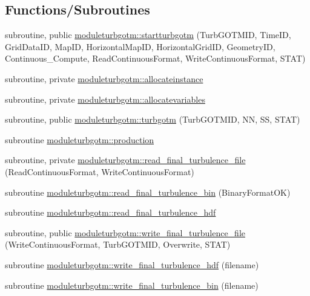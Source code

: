 \subsection*{Functions/\+Subroutines}
\begin{DoxyCompactItemize}
\item 
subroutine, public \mbox{\hyperlink{namespacemoduleturbgotm_ade6cfc34dc78769397885a40df0e608b}{moduleturbgotm\+::startturbgotm}} (Turb\+G\+O\+T\+M\+ID, Time\+ID, Grid\+Data\+ID, Map\+ID, Horizontal\+Map\+ID, Horizontal\+Grid\+ID, Geometry\+ID, Continuous\+\_\+\+Compute, Read\+Continuous\+Format, Write\+Continuous\+Format, S\+T\+AT)
\item 
subroutine, private \mbox{\hyperlink{namespacemoduleturbgotm_a1f367dad0fd7a9dba96b5da89226bfdb}{moduleturbgotm\+::allocateinstance}}
\item 
subroutine, private \mbox{\hyperlink{namespacemoduleturbgotm_ad863a5918db79e19552388fff6750b22}{moduleturbgotm\+::allocatevariables}}
\item 
subroutine, public \mbox{\hyperlink{namespacemoduleturbgotm_ab0d8f0e83e75ef88108e4b2bf04543c0}{moduleturbgotm\+::turbgotm}} (Turb\+G\+O\+T\+M\+ID, NN, SS, S\+T\+AT)
\item 
subroutine \mbox{\hyperlink{namespacemoduleturbgotm_a67c6b885be20c57ed033df6706d9adab}{moduleturbgotm\+::production}}
\item 
subroutine, private \mbox{\hyperlink{namespacemoduleturbgotm_afb5ea6833bc3fb9e5ef6bc373e92a305}{moduleturbgotm\+::read\+\_\+final\+\_\+turbulence\+\_\+file}} (Read\+Continuous\+Format, Write\+Continuous\+Format)
\item 
subroutine \mbox{\hyperlink{namespacemoduleturbgotm_ad942836f5c266b4ce7d03ca96fdf696a}{moduleturbgotm\+::read\+\_\+final\+\_\+turbulence\+\_\+bin}} (Binary\+Format\+OK)
\item 
subroutine \mbox{\hyperlink{namespacemoduleturbgotm_a8389365bd5c5c531982068da1e23ce6f}{moduleturbgotm\+::read\+\_\+final\+\_\+turbulence\+\_\+hdf}}
\item 
subroutine, public \mbox{\hyperlink{namespacemoduleturbgotm_a01feda969236095bbd86a65a94f4e37c}{moduleturbgotm\+::write\+\_\+final\+\_\+turbulence\+\_\+file}} (Write\+Continuous\+Format, Turb\+G\+O\+T\+M\+ID, Overwrite, S\+T\+AT)
\item 
subroutine \mbox{\hyperlink{namespacemoduleturbgotm_afdd63df0733f254a488fb73b240eb944}{moduleturbgotm\+::write\+\_\+final\+\_\+turbulence\+\_\+hdf}} (filename)
\item 
subroutine \mbox{\hyperlink{namespacemoduleturbgotm_a471003d8ec76b83e26d91b8ed4815546}{moduleturbgotm\+::write\+\_\+final\+\_\+turbulence\+\_\+bin}} (filename)

\end{DoxyCompactItemize}
